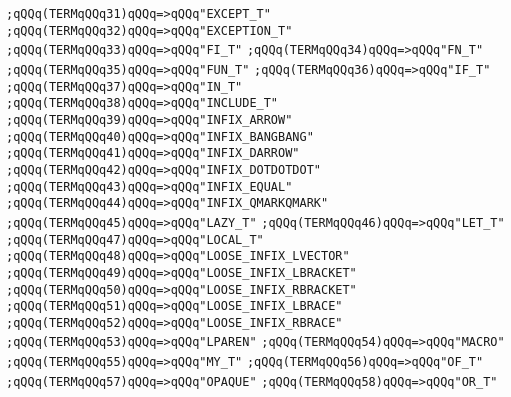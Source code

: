 \verb|;qQQq(TERMqQQq31)qQQq=>qQQq"EXCEPT_T"|\newline
\verb|;qQQq(TERMqQQq32)qQQq=>qQQq"EXCEPTION_T"|\newline
\verb|;qQQq(TERMqQQq33)qQQq=>qQQq"FI_T"|\newline
\verb|;qQQq(TERMqQQq34)qQQq=>qQQq"FN_T"|\newline
\verb|;qQQq(TERMqQQq35)qQQq=>qQQq"FUN_T"|\newline
\verb|;qQQq(TERMqQQq36)qQQq=>qQQq"IF_T"|\newline
\verb|;qQQq(TERMqQQq37)qQQq=>qQQq"IN_T"|\newline
\verb|;qQQq(TERMqQQq38)qQQq=>qQQq"INCLUDE_T"|\newline
\verb|;qQQq(TERMqQQq39)qQQq=>qQQq"INFIX_ARROW"|\newline
\verb|;qQQq(TERMqQQq40)qQQq=>qQQq"INFIX_BANGBANG"|\newline
\verb|;qQQq(TERMqQQq41)qQQq=>qQQq"INFIX_DARROW"|\newline
\verb|;qQQq(TERMqQQq42)qQQq=>qQQq"INFIX_DOTDOTDOT"|\newline
\verb|;qQQq(TERMqQQq43)qQQq=>qQQq"INFIX_EQUAL"|\newline
\verb|;qQQq(TERMqQQq44)qQQq=>qQQq"INFIX_QMARKQMARK"|\newline
\verb|;qQQq(TERMqQQq45)qQQq=>qQQq"LAZY_T"|\newline
\verb|;qQQq(TERMqQQq46)qQQq=>qQQq"LET_T"|\newline
\verb|;qQQq(TERMqQQq47)qQQq=>qQQq"LOCAL_T"|\newline
\verb|;qQQq(TERMqQQq48)qQQq=>qQQq"LOOSE_INFIX_LVECTOR"|\newline
\verb|;qQQq(TERMqQQq49)qQQq=>qQQq"LOOSE_INFIX_LBRACKET"|\newline
\verb|;qQQq(TERMqQQq50)qQQq=>qQQq"LOOSE_INFIX_RBRACKET"|\newline
\verb|;qQQq(TERMqQQq51)qQQq=>qQQq"LOOSE_INFIX_LBRACE"|\newline
\verb|;qQQq(TERMqQQq52)qQQq=>qQQq"LOOSE_INFIX_RBRACE"|\newline
\verb|;qQQq(TERMqQQq53)qQQq=>qQQq"LPAREN"|\newline
\verb|;qQQq(TERMqQQq54)qQQq=>qQQq"MACRO"|\newline
\verb|;qQQq(TERMqQQq55)qQQq=>qQQq"MY_T"|\newline
\verb|;qQQq(TERMqQQq56)qQQq=>qQQq"OF_T"|\newline
\verb|;qQQq(TERMqQQq57)qQQq=>qQQq"OPAQUE"|\newline
\verb|;qQQq(TERMqQQq58)qQQq=>qQQq"OR_T"|\newline
